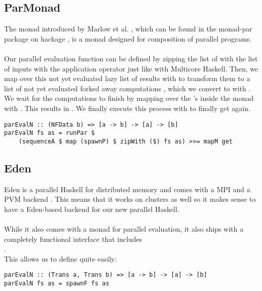 \subsection{ParMonad}
The  monad introduced by Marlow et al. \cite{monad_par_paper_2011}, which can be found in the monad-par package on hackage \cite{monad_par_hackage}, is a monad designed for composition of parallel programs.
\\\\
Our parallel evaluation function  can be defined by zipping the list of \code{[a -> b]} with the list of inputs \code{[a]} with the application operator \code{\$} just like with Multicore Haskell. Then, we map over this not yet evaluated lazy list of results \code{[b]} with  to transform them to a list of not yet evaluated forked away computations , which we convert to  with . We wait for the computations to finish by mapping over the 's inside the  monad with . This results in . We finally execute this process with  to finally get \code{[b]} again.
\begin{lstlisting}[frame=htrbl]
parEvalN :: (NFData b) => [a -> b] -> [a] -> [b]
parEvalN fs as = runPar $ 
	(sequenceA $ map (spawnP) $ zipWith ($) fs as) >>= mapM get
\end{lstlisting}

\subsection{Eden}
Eden  is a parallel Haskell for distributed memory and comes with a MPI and a PVM backend \cite{eden_hackage, Loogen2012, eden_homepage}. This means that it works on clusters as well so it makes sense to have a Eden-based backend for our new parallel Haskell.
\\\\
While it also comes with a monad  for parallel evaluation, it also ships with a completely functional interface that includes
\\
.
\\
This allows us to define  quite easily:
\begin{lstlisting}[frame=htrbl]
parEvalN :: (Trans a, Trans b) => [a -> b] -> [a] -> [b]
parEvalN fs as = spawnF fs as
\end{lstlisting}